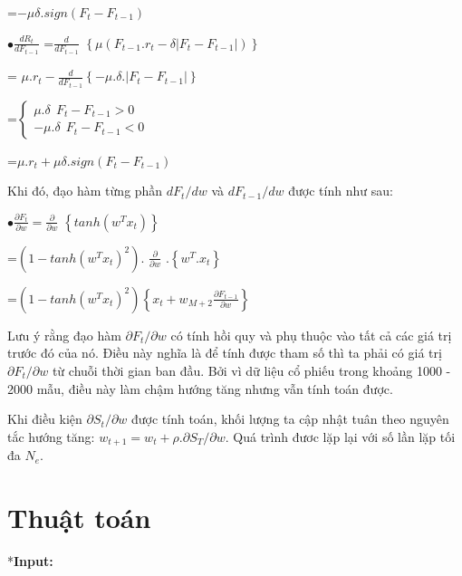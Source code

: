 \documentclass[14pt]{extreport}
\begin{document}
\hspace{1.2cm}=$-\mu\delta.sign\left ( F_t-F_{t-1} \right )$

{\Large $\bullet \frac{dR_t}{dF_{t-1}}$} {\Large=$\frac{d}{dF_{t-1}}$ }$\left \{ \mu\left ( F_{t-1}.r_t-\delta\left | F_t-F_{t-1} \right | \right ) \right \}$


\hspace{1.2cm} = {\Large$\mu.r_t-\frac{d}{dF_{t-1}}$}$\left \{ -\mu.\delta.\left | F_t-F_{t-1} \right | \right \}$


\hspace{1.2cm}=$\left\{\begin{matrix}
 \mu.\delta \ \  F_t-F_{t-1}>0  & \\ 
 -\mu.\delta \ \ F_t-F_{t-1}<0
\end{matrix}\right.$


\hspace{1.2cm}=$\mu.r_t+\mu \delta.sign\left ( F_t-F_{t-1} \right )$


Khi đó, đạo hàm từng phần $dF_t/dw$ và $dF_{t-1}/dw$ được tính như sau:

{\Large $\bullet\frac{\partial F_t}{\partial w} = \frac{\partial}{\partial w}$ }$\left \{ tanh(w^Tx_t) \right \}$

\hspace{1.2cm}=$\left ( 1-tanh\left ( w^Tx_t \right )^2 \right ).$ {\Large$\frac{\partial}{\partial w}$ } $.\left \{ w^T.x_t \right \}$

\hspace{1.2cm}=$\left ( 1-tanh\left ( w^Tx_t \right )^2 \right )\left \{ x_t+w_{M+2}\frac{\partial F_{t-1}}{\partial w}\right \}$

Lưu ý rằng đạo hàm $\partial F_t/\partial w$ có tính hồi quy và phụ thuộc vào tất cả các giá trị trước đó của nó. Điều này nghĩa là để tính được tham số thì ta phải có giá trị $\partial F_t/\partial w$ từ chuỗi thời gian ban đầu. Bởi vì dữ liệu cổ phiếu trong khoảng 1000 - 2000 mẫu, điều này làm chậm hướng tăng nhưng vẫn tính toán được.

Khi điều kiện $\partial S_t/\partial w$ được tính toán, khối lượng ta cập nhật tuân theo nguyên tắc hướng tăng: $w_{t+1}=w_t+\rho.\partial S_T/\partial w$. Quá trình đươc lặp lại với số lần lặp tối đa $N_e$.

\section{Thuật toán}

*\textbf{Input: }
\end{document}
